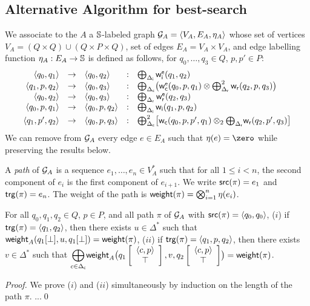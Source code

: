 %


\subsection*{Alternative Algorithm for best-search}
We associate to the \SWVPA $A$ a $\mathbb{S}$-labeled graph
$\G_A = \< V_A, E_A, \eta_A >$
whose set of vertices $V_A = (Q \times Q) \cup (Q \times P \times Q)$,
set of edges $E_A = V_A \times V_A$, and edge labelling function 
$\eta_A : E_A \to \mathbb{S}$ is defined as follows,
for $q_0,\ldots, q_3 \in Q$, $p, p' \in P$:
%
\[
\begin{array}{rclcl}
\< q_0, q_1> & \to & \< q_0, q_2> & : &
\bigoplus_{\Deltai} \weiei(q_1, q_2)\\
%
\< q_1, p, q_2> & \to & \<q_0, q_3> & : &
\bigoplus_{\Deltac} \bigl( \weiec(q_0, p, q_1) \otimes \bigoplus^2_{\Deltar} \weir(q_2, p, q_3)\bigr)\\ 
%
\< q_0, q_2> & \to & \< q_0, q_3> & : & 
\bigoplus_{\Deltar} \weier(q_2, q_3)\\
% 
\< q_0, p, q_1> & \to & \< q_0, p, q_2> & : &
\bigoplus_{\Deltai} \weii(q_1, p, q_2)\\[1mm]
%
\< q_1, p', q_2> & \to & \< q_0, p, q_3> & : &
\bigoplus^2_{\Deltac} \bigl[ \weic(q_0, p, p', q_1) \otimes_2 {\bigoplus_{\Deltar}} \weir(q_2, p', q_3) \bigr]\\
\end{array}
\]
We can remove from $\mathcal{G}_A$ every edge $e \in E_A$ such that $\eta(e) = \zero$ 
while preserving the results below.

A \emph{path} of $\mathcal{G}_A$ is a sequence $e_1,\ldots, e_n \in V^*_A$ such that 
for all $1 \leq i < n$, the second component of $e_i$ is the first component of $e_{i+1}$.
We write $\mathsf{src}(\pi) = e_1$ and $\mathsf{trg}(\pi) = e_n$.
The weight of the path is $\mathsf{weight}(\pi) = \bigotimes_{i=1}^{n} \eta(e_i)$.

\begin{lemma}[Correctness]
For all $q_0, q_1, q_2 \in Q$, $p\in P$, 
and all path $\pi$ of $\mathcal{G}_A$ with $\src(\pi) = \<q_0, q_0>$,
($i$) if $\trg(\pi) = \< q_1, q_2>$, 
then there exists $u \in \Delta^*$ such that 
$\mathsf{weight}_A(q_1[\bot], u, q_1[\bot]) = \mathsf{weight}(\pi)$,
%
($ii$) if $\trg(\pi) = \< q_1, p, q_2>$,
then there exists $v \in \Delta^*$ such that 
${\displaystyle\bigoplus_{c \in \Deltac}}
 \weight_A\bigl(\configup{q_1}{\< c, p> \stackup \top }, v, \configup{q_2}{\<c, p> \stackup \top}\bigr)
 = \weight(\pi)$.
\end{lemma}
%
\begin{proof}
We prove ($i$) and ($ii$) simultaneously by induction on the length of the path $\pi$.
...\qed
\end{proof}



